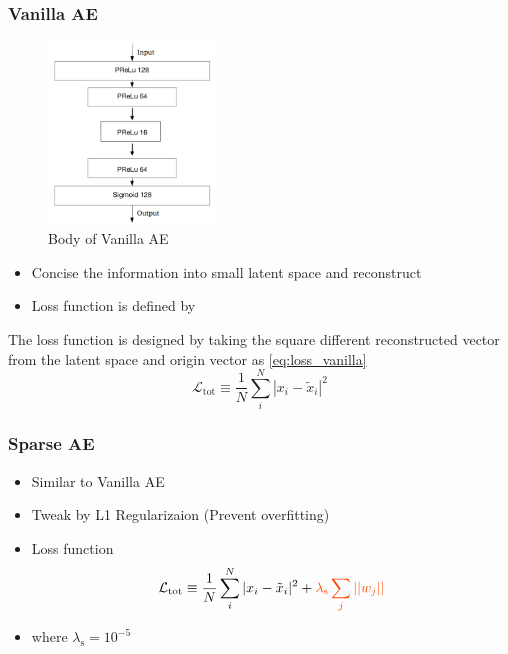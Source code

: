 \subsubsection{Vanilla AE}
\begin{figure}[h!]
    \centering
    \includegraphics[width=0.4\textwidth]{images/vanilla_ae.png}
    \caption{Body of Vanilla AE}
    \label{fig:vanilla_ae}
\end{figure}
\begin{itemize}
    \item Concise the information into small latent space and reconstruct
    \item Loss function is defined by
\end{itemize}
The loss function is designed by taking the square different reconstructed vector from the latent space and origin vector as \ref{eq:loss_vanilla}
\begin{equation}\label{eq:loss_vanilla}
    \mathcal{L}_{\text{tot}} \equiv \frac{1}{N}\sum_i^N |x_i-\tilde{x}_i|^2
\end{equation}

\subsubsection{Sparse AE}
\begin{itemize}
    \item Similar to Vanilla AE
    \item Tweak by \textcolor[RGB]{255,69,0}{L1 Regularizaion (Prevent overfitting)}
    \item Loss function
    \begin{equation}
        \mathcal{L}_{\text{tot}} \equiv \frac{1}{N}\sum_i^N |x_i-\tilde{x}_i|^2 + \textcolor[RGB]{255,69,0}{\lambda_{\text{s}}\sum_j||w_j||}
    \end{equation}
    \item where $\lambda_{\text{s}} = 10^{-5}$
\end{itemize}

